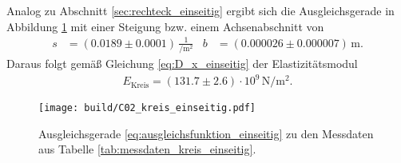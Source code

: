\noindent
Analog zu Abschnitt \ref{sec:rechteck_einseitig} ergibt sich die Ausgleichsgerade in Abbildung \ref{fig:plot_kreis_einseitig}
mit einer Steigung bzw. einem Achsenabschnitt von 
\begin{align*}
    s &= (\num{0.0189} \pm \num{0.0001}) \, \frac{1}{\unit{\per\meter^2}} & b &= (\num{0.000026} \pm \num{0.000007}) \, \unit{\meter}.
\end{align*}
Daraus folgt gemäß Gleichung \eqref{eq:D_x_einseitig} der Elastizitätsmodul
\begin{align}
    E_\text{Kreis} = (\num{131.7} \pm \num{2.6}) \cdot 10^9 \, \unit{\newton\per\meter^2}.
\end{align}

\begin{figure}[H]
    \centering
    \texttt{[image: build/C02\_kreis\_einseitig.pdf]}
    \caption{Ausgleichsgerade \eqref{eq:ausgleichsfunktion_einseitig} zu den Messdaten aus Tabelle \ref{tab:messdaten_kreis_einseitig}.}
    \label{fig:plot_kreis_einseitig}
\end{figure}